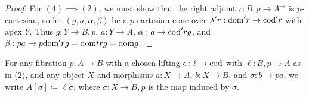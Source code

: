 \documentclass[../thesis.tex]{subfiles}
\begin{document}
\begin{proof}
  For $(4) \implies (2)$, we must show that the right adjoint $r : B \comma p \to A^\to$ is $p$-cartesian, so let
  $(g,a,\alpha,\beta)$ be a $p$-cartesian cone over $\lambda' r : {\mathrm{dom}}' r \to {\mathrm{cod}}' r$ with apex $Y$. Thus
  $g : Y \to B \comma p$, $a : Y \to A$, $\alpha : a \to {\mathrm{cod}}'r g$, and $\beta : pa \to p{\mathrm{dom}}'rg = {\mathrm{dom}} trg
  = {\mathrm{dom}} g$.
\end{proof}

\begin{notation}
  For any fibration $p : A \to B$ with a chosen lifting $\epsilon : \ell \to {\mathrm{cod}}$ with $\ell : B \comma p \to A$
  as in (2), and any object $X$ and morphisms $a : X \to A$, $b : X \to B$, and $\sigma : b \to pa$, we write
  $A[\sigma] \coloneq \ell\bar\sigma$, where $\bar \sigma : X \to B \comma p$ is the map induced by $\sigma$.
\end{notation}

\ifSubfilesClassLoaded{\printbibliography}{}
  
\end{document}
